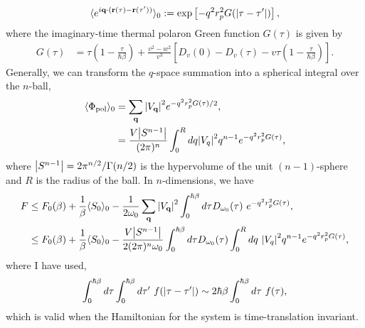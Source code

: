 \begin{equation}
    \langle e^{i \vb{q} \cdot (\vb{r}(\tau) - \vb{r}(\tau'))} \rangle_0 := \exp\left[-q^2 r_p^2 G(\abs{\tau - \tau'})\right] ,
\end{equation}
 where the imaginary-time thermal polaron Green function $G(\tau)$ is given by
\begin{equation} \label{eqn:polarongreensfunc}
    \begin{aligned}
        G(\tau) &= \tau \left(1 - \frac{\tau}{\hbar\beta}\right) + \frac{v^2 - w^2}{v^3} \left[ D_v(0) - D_v(\tau) - v \tau \left(1 - \frac{\tau}{\hbar\beta} \right) \right].
    \end{aligned}
\end{equation}
Generally, we can transform the $q$-space summation into a spherical integral over the $n$-ball,
\begin{equation} \label{eqn:general_self_interaction}
    \begin{aligned}
        \langle \Phi_{\text{pol}}\rangle_0 &= \sum_{\vb{q}} \abs{V_{\vb{q}}}^2 e^{-q^2 r_p^2 G(\tau) / 2} , \\
        &= \frac{V \abs{S^{n-1}}}{(2\pi)^n} \int_0^R dq \abs{V_q}^2 q^{n-1} e^{-q^2 r_p^2 G(\tau)} ,
    \end{aligned}
\end{equation}
where $\abs{S^{n-1}} = 2\pi^{n/2}/\Gamma(n/2)$ is the hypervolume of the unit $(n-1)$-sphere and $R$ is the radius of the ball. In $n$-dimensions, we have
\begin{equation}\label{eqn:generalfreeenergy}
    \begin{aligned}
        F &\leq F_0(\beta) + \frac{1}{\beta} \langle S_0 \rangle_{0} - \frac{1}{2\omega_0} \sum_{\vb{q}} \abs{V_{\vb{q}}}^2 \int_0^{\hbar\beta} d\tau D_{\omega_0}(\tau)\ e^{-q^2 r_p^2 G(\tau)} , \\
        &\leq F_0(\beta) + \frac{1}{\beta} \langle S_0 \rangle_{0} - \frac{V \abs{S^{n-1}}}{2 (2\pi)^n \omega_0} \int_0^{\hbar\beta} d\tau D_{\omega_0}(\tau) \int_0^R dq\ \abs{V_q}^2 q^{n-1} e^{-q^2 r_p^2 G(\tau)} ,
    \end{aligned}
\end{equation}
where I have used,
\begin{equation}
    \int_0^{\hbar\beta} d\tau \int_0^{\hbar\beta} d\tau'\ f(\abs{\tau - \tau'}) \sim 2\hbar\beta \int_0^{\hbar\beta}d\tau\ f(\tau),
\end{equation}
which is valid when the Hamiltonian for the system is time-translation invariant.
\newline

